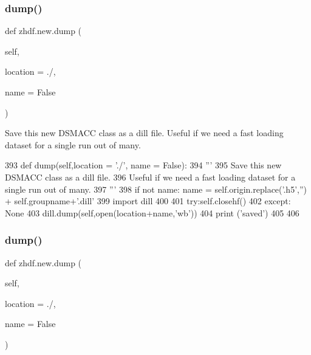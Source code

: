 \mbox{\label{classzhdf_1_1new_a87ee987ac4b5f4fea8cc03cd78744f81}} 
\subsubsection{\texorpdfstring{dump()}{dump()}\hspace{0.1cm}{\footnotesize\ttfamily [1/2]}}
{\footnotesize\ttfamily def zhdf.\+new.\+dump (\begin{DoxyParamCaption}\item[{}]{self,  }\item[{}]{location = {\ttfamily \textquotesingle{}./\textquotesingle{}},  }\item[{}]{name = {\ttfamily False} }\end{DoxyParamCaption})}

\begin{DoxyVerb}Save this new DSMACC class as a dill file.
Useful if we need a fast loading dataset for a single run out of many.
\end{DoxyVerb}
 
\begin{DoxyCode}
393     \textcolor{keyword}{def }dump(self,location = './', name = False):
394         \textcolor{stringliteral}{'''}
395 \textcolor{stringliteral}{        Save this new DSMACC class as a dill file.}
396 \textcolor{stringliteral}{        Useful if we need a fast loading dataset for a single run out of many.}
397 \textcolor{stringliteral}{        '''}
398         \textcolor{keywordflow}{if} \textcolor{keywordflow}{not} name: name = self.origin.replace(\textcolor{stringliteral}{'.h5'},\textcolor{stringliteral}{''})  + self.groupname+\textcolor{stringliteral}{'.dill'}
399         \textcolor{keyword}{import} dill
400 
401         \textcolor{keywordflow}{try}:self.closehf()
402         \textcolor{keywordflow}{except}: \textcolor{keywordtype}{None}
403         dill.dump(self,open(location+name,\textcolor{stringliteral}{'wb'}))
404         \textcolor{keywordflow}{print} (\textcolor{stringliteral}{'saved'})
405 
406 
\end{DoxyCode}
\mbox{\label{classzhdf_1_1new_a87ee987ac4b5f4fea8cc03cd78744f81}} 
\subsubsection{\texorpdfstring{dump()}{dump()}\hspace{0.1cm}{\footnotesize\ttfamily [2/2]}}
{\footnotesize\ttfamily def zhdf.\+new.\+dump (\begin{DoxyParamCaption}\item[{}]{self,  }\item[{}]{location = {\ttfamily \textquotesingle{}./\textquotesingle{}},  }\item[{}]{name = {\ttfamily False} }\end{DoxyParamCaption})}

